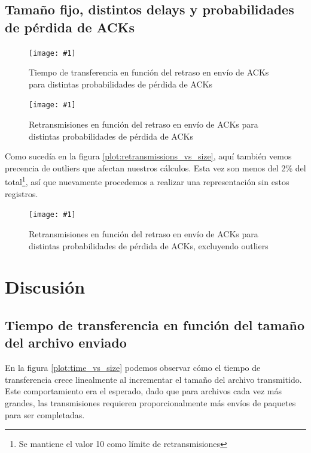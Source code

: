 \documentclass[a4paper, 10pt, twoside]{article}
\newcommand{\grafico}[3]{
  \begin{figure}[H]
    \texttt{[image: \#1]}
    \caption{#2}
    \label{#3}
  \end{figure}
}
\begin{document}
\subsection{Tamaño fijo, distintos delays y probabilidades de pérdida de ACKs}

\grafico{time_vs_delay_and_loss_probability}
        {Tiempo de transferencia en función del retraso en envío de ACKs para distintas probabilidades de pérdida de ACKs}
        {plot:time_vs_delay_and_loss_probability}

\grafico{retransmissions_vs_delay_and_loss_probability}
        {Retransmisiones en función del retraso en envío de ACKs para distintas probabilidades de pérdida de ACKs}
        {plot:retransmissions_vs_delay_and_loss_probability}

Como sucedía en la figura \ref{plot:retransmissions_vs_size}, aquí también vemos precencia de outliers que afectan nuestros cálculos. Esta vez son menos del 2\% del total\footnote{Se mantiene el valor 10 como límite de retransmisiones}, así que nuevamente procedemos a realizar una representación sin estos registros.

\grafico{retransmissions_vs_delay_and_loss_probability_wo_outliers}
        {Retransmisiones en función del retraso en envío de ACKs para distintas probabilidades de pérdida de ACKs, excluyendo outliers}
        {plot:retransmissions_vs_delay_and_loss_probability_wo_outliers}




\section{Discusión}
\label{sec:discusion}


\subsection{Tiempo de transferencia en función del tamaño del archivo enviado}

En la figura \ref{plot:time_vs_size} podemos observar cómo el tiempo de transferencia crece linealmente al incrementar el tamaño del archivo transmitido. Este comportamiento era el esperado, dado que para archivos cada vez más grandes, las transmisiones requieren proporcionalmente más envíos de paquetes para ser completadas.
\end{document}
